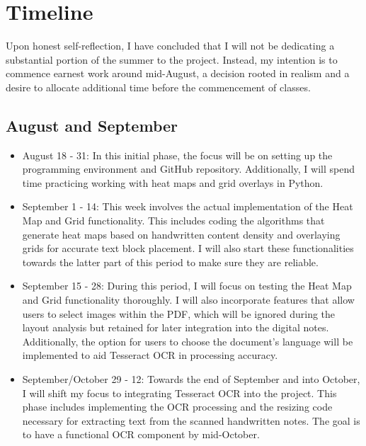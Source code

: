 \documentclass[10pt,twocolumn]{article}
\begin{document}
\section{Timeline}
Upon honest self-reflection, I have concluded that I will not be dedicating a substantial portion of the summer to the project. Instead, my intention is to commence earnest work around mid-August, a decision rooted in realism and a desire to allocate additional time before the commencement of classes.
\subsection{August and September}
\begin{itemize}
  \item August 18 - 31: In this initial phase, the focus will be on setting up the programming environment and GitHub repository. Additionally, I will spend time practicing working with heat maps and grid overlays in Python.
  \item September 1 - 14: This week involves the actual implementation of the Heat Map and Grid functionality. This includes coding the algorithms that generate heat maps based on handwritten content density and overlaying grids for accurate text block placement. I will also start these functionalities towards the latter part of this period to make sure they are reliable. 
  \item September 15 - 28: During this period, I will focus on testing the Heat Map and Grid functionality thoroughly. I will also incorporate features that allow users to select images within the PDF, which will be ignored during the layout analysis but retained for later integration into the digital notes. Additionally, the option for users to choose the document's language will be implemented to aid Tesseract OCR in processing accuracy.
  \item September/October 29 - 12: Towards the end of September and into October, I will shift my focus to integrating Tesseract OCR into the project. This phase includes implementing the OCR processing and the resizing code necessary for extracting text from the scanned handwritten notes. The goal is to have a functional OCR component by mid-October.
\end{itemize}
\end{document}
